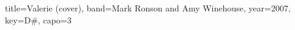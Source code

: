 \documentclass{../../tex/bekki-leadsheet}
\begin{document}
\begin{song}[transpose-capo=true]{title={Valerie (cover)}, band={Mark Ronson and Amy Winehouse}, year={2007}, key={D#}, capo={3}}

  

\end{song}
\end{document}
